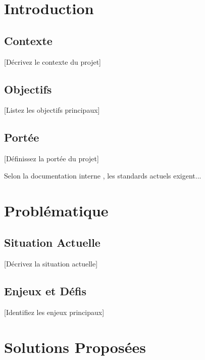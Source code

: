 \clearpage
{}
\setcounter{page}{1}

\section{Introduction}

\subsection{Contexte}
[Décrivez le contexte du projet]

\subsection{Objectifs}
[Listez les objectifs principaux]

\subsection{Portée}
[Définissez la portée du projet]

Selon la documentation interne , les standards actuels exigent...

\section{Problématique}

\subsection{Situation Actuelle}
[Décrivez la situation actuelle]


\subsection{Enjeux et Défis}
[Identifiez les enjeux principaux]


\section{Solutions Proposées}


